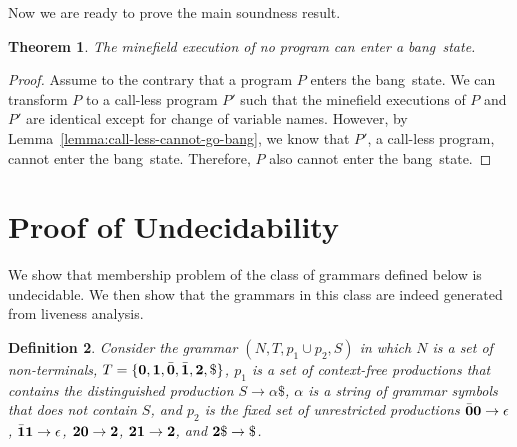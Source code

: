 \documentclass[9pt,nonatbib]{sigplanconf}
\newcommand{\bang}{\mbox{\sc bang}}
\newtheorem{theorem}{Theorem}[section]
\newtheorem{proposition}[theorem]{Proposition}
\newtheorem{definition}[theorem]{Definition}
\begin{document}
Now we are ready to prove the main soundness result.

\begin{theorem}
The  minefield  execution of  no  program  can enter  a
\bang\ state.
\end{theorem}
 
\begin{proof}
Assume to  the contrary that  a program $P$  enters the
\bang\  state.  We can  transform  $P$  to a  call-less
program $P'$ such that  the minefield executions of $P$
and $P'$  are identical  except for change  of variable
names.             However,                 by
Lemma~\ref{lemma:call-less-cannot-go-bang}, we know that
$P'$,   a   call-less   program,   cannot   enter   the
\bang\  state.  Therefore,   $P$  also  cannot  enter  the
\bang\ state.
\end{proof} \vspace*{-1mm}


\section{Proof of Undecidability}
\label{sec:undec}
We show that  membership problem  of the  class of  grammars defined below 
is undecidable.   We then  show that  the grammars  in this  class are
indeed generated from liveness analysis.
\begin{definition}\label{def:specialgrammar}
Consider the  grammar $(N,T,  p_1\cup p_2,S)$  in which
$N$ is  a set  of non-terminals,  $T =  \{\mathbf{0}, \mathbf{1},
\bar{\mathbf{0}},  \bar{\mathbf{1}},  {\mathbf{2}},  \$\}$,   $p_1$  is  a  set  of
context-free    productions     that    contains    the
distinguished  production   $S  \rightarrow  \alpha\$$,
$\alpha$ is a  string of grammar symbols  that does not
contain $S$, and $p_2$ is the fixed set of unrestricted
productions    $\bar{\mathbf{0}}\mathbf{0}    \rightarrow    \epsilon$,
$\bar{\mathbf{1}}\mathbf{1}    \rightarrow   \epsilon$,    ${\mathbf{2}}\mathbf{0}
\rightarrow {\mathbf{2}}$,  ${\mathbf{2}}\mathbf{1} \rightarrow {\mathbf{2}}$,
and $\clazy\$ \rightarrow \$ $.
\end{definition}

\end{document}
